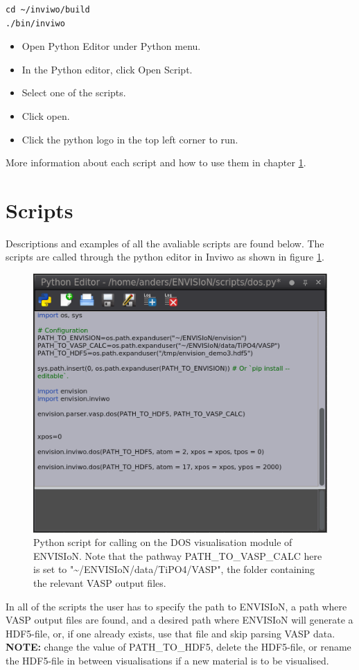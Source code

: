 \documentclass[a4paper,12pt]{article}
\begin{document}
\begin{lstlisting}[frame = single, breaklines=true]
cd ~/inviwo/build
./bin/inviwo
\end{lstlisting}

\begin{itemize}
\item Open Python Editor under Python menu.
\item In the Python editor, click Open Script.
\item Select one of the scripts.
\item Click open.
\item Click the python logo in the top left corner to run.
\end{itemize}

More information about each script and how to use them in chapter \ref{ch:scripts}.

\section{Scripts}
\label{ch:scripts}
Descriptions and examples of all the avaliable scripts are found below. The scripts are called through the python editor in Inviwo as shown in figure \ref{fig:python_editor}.

\begin{figure} [H]
\centering
\includegraphics[scale=0.6]{screenshot_dos_script.png}
\caption{Python script for calling on the DOS visualisation module of ENVISIoN. Note that the pathway PATH\_TO\_VASP\_CALC here is set to "\textasciitilde/ENVISIoN/data/TiPO4/VASP", the folder containing the relevant VASP output files.}
\label{fig:python_editor}
\end{figure}
In all of the scripts the user has to specify the path to ENVISIoN, a path where VASP output files are found, and a desired path where ENVISIoN will generate a HDF5-file, or, if one already exists, use that file and skip parsing VASP data. \textbf{NOTE:} change the value of PATH\_TO\_HDF5, delete the HDF5-file, or rename the HDF5-file in between visualisations if a new material is to be visualised.
\end{document}
